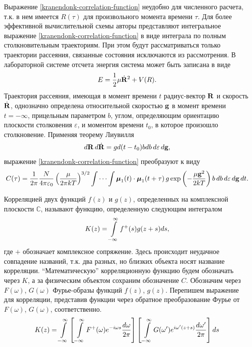 Выражение \eqref{kranendonk-correlation-function} неудобно для численного расчета, т.к. в нем имеется $R(\tau)$ для произвольного момента времени $\tau$. Для более эффективной вычислительной схемы авторы представляют интегральное выражение \eqref{kranendonk-correlation-function} в виде интеграла по полным столкновительным траекториям. При этом будут рассматриваться только траектории рассеяния, связанные состояния исключаются из рассмотрения. В лабораторной системе отсчета энергия система может быть записана в виде
\begin{gather}
    E = \frac{1}{2} \mu \dot{\mathbf{R}}^2 + V(R).
\end{gather}
Траектория рассеяния, имеющая в момент времени $t$ радиус-вектор $\mathbf{R}$ и скорость $\dot{\mathbf{R}}$, однозначно определена относительной скоростью $\mathbf{g}$ в момент времени $t = -\infty$, прицельным параметром $b$, углом, определяющим ориентацию плоскости столковения $\varepsilon$, и моментом времени $t_0$, в которое произошло столкновение. Применяя теорему Лиувилля
\begin{gather}
    d \mathbf{R} \, d\dot{\mathbf{R}} = g d(t - t_0) b db \, d\varepsilon \, d\mathbf{g},
\end{gather}
%
выражение \eqref{kranendonk-correlation-function} преобразуют к виду
\begin{gather}
    C(\tau) = \frac{1}{2 \pi} \frac{N}{4 \pi \varepsilon_0} \left( \frac{\mu}{2 \pi k T} \right)^{3/2} \idotsint \boldsymbol{\mu}_1(t) \cdot \boldsymbol{\mu}_1(t + \tau) \, g \exp \left( - \frac{\mu \mathbf{g}^2}{2 k T} \right) b \, db \, d\varepsilon \, d \mathbf{g} \, dt. \label{correlation-function-kranendonk}
\end{gather}

Корреляцией двух функций $f(z)$ и $g(z)$, определенных на комплексной плоскости $\mathbb{C}$, называют функцию, определенную следующим интегралом
\begin{gather}
    K(z) = \int\limits_{-\infty}^\infty f^+(s) g(z + s) ds,
\end{gather}
% 
где $+$ обозначает комплексное сопряжение. Здесь происходит неудачное совпадение названий, т.к. два разных, но близких объекта носят название корреляции. \enquote{Математическую} корреляционную функцию будем обозначать через $K$, а за физическим объектом сохраним обозначение $C$. Обозначим через $F(\omega)$, $G(\omega)$ Фурье-образы функций $f(z)$, $g(z)$. Перепишем выражение для корреляции, представив функции через обратное преобразование Фурье от $F(\omega)$, $G(\omega)$, соответственно.
\begin{gather}
    K(z) = \int\limits_{-\infty}^\infty \left[ \, \int\limits_{-\infty}^\infty F^+(\omega) e^{-i \omega s} \frac{d \omega}{2 \pi} \right] \left[ \, \int\limits_{-\infty}^\infty G(\omega^\prime) e^{i \omega^\prime (z + s)} \frac{d\omega^\prime}{2 \pi} \right] ds
\end{gather}

